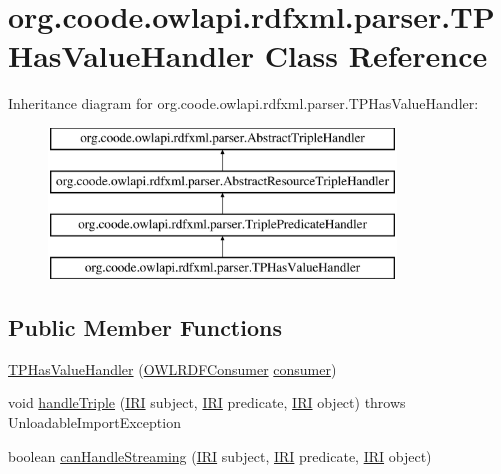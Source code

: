 \hypertarget{classorg_1_1coode_1_1owlapi_1_1rdfxml_1_1parser_1_1_t_p_has_value_handler}{\section{org.\-coode.\-owlapi.\-rdfxml.\-parser.\-T\-P\-Has\-Value\-Handler Class Reference}
\label{classorg_1_1coode_1_1owlapi_1_1rdfxml_1_1parser_1_1_t_p_has_value_handler}
}
Inheritance diagram for org.\-coode.\-owlapi.\-rdfxml.\-parser.\-T\-P\-Has\-Value\-Handler\-:\begin{figure}[H]
\begin{center}
\leavevmode
\includegraphics[height=4.000000cm]{classorg_1_1coode_1_1owlapi_1_1rdfxml_1_1parser_1_1_t_p_has_value_handler}
\end{center}
\end{figure}
\subsection*{Public Member Functions}
\begin{DoxyCompactItemize}
\item 
\hyperlink{classorg_1_1coode_1_1owlapi_1_1rdfxml_1_1parser_1_1_t_p_has_value_handler_a877e6097628ff0da0accfb42321fa705}{T\-P\-Has\-Value\-Handler} (\hyperlink{classorg_1_1coode_1_1owlapi_1_1rdfxml_1_1parser_1_1_o_w_l_r_d_f_consumer}{O\-W\-L\-R\-D\-F\-Consumer} \hyperlink{classorg_1_1coode_1_1owlapi_1_1rdfxml_1_1parser_1_1_abstract_triple_handler_a4ccf4d898ff01eb1cadfa04b23d54e9c}{consumer})
\item 
void \hyperlink{classorg_1_1coode_1_1owlapi_1_1rdfxml_1_1parser_1_1_t_p_has_value_handler_a7bdbc5494f660cc8652ada32bab2a57d}{handle\-Triple} (\hyperlink{classorg_1_1semanticweb_1_1owlapi_1_1model_1_1_i_r_i}{I\-R\-I} subject, \hyperlink{classorg_1_1semanticweb_1_1owlapi_1_1model_1_1_i_r_i}{I\-R\-I} predicate, \hyperlink{classorg_1_1semanticweb_1_1owlapi_1_1model_1_1_i_r_i}{I\-R\-I} object)  throws Unloadable\-Import\-Exception 
\item 
boolean \hyperlink{classorg_1_1coode_1_1owlapi_1_1rdfxml_1_1parser_1_1_t_p_has_value_handler_a0b3c83f41d178a5c88e494f34aa95a28}{can\-Handle\-Streaming} (\hyperlink{classorg_1_1semanticweb_1_1owlapi_1_1model_1_1_i_r_i}{I\-R\-I} subject, \hyperlink{classorg_1_1semanticweb_1_1owlapi_1_1model_1_1_i_r_i}{I\-R\-I} predicate, \hyperlink{classorg_1_1semanticweb_1_1owlapi_1_1model_1_1_i_r_i}{I\-R\-I} object)
\end{DoxyCompactItemize}
